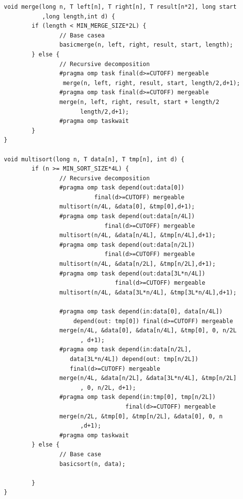 \documentclass{article}
\begin{document}
\begin{lstlisting}
void merge(long n, T left[n], T right[n], T result[n*2], long start
           ,long length,int d) {
        if (length < MIN_MERGE_SIZE*2L) {
                // Base casea
                basicmerge(n, left, right, result, start, length);
        } else {
                // Recursive decomposition
                #pragma omp task final(d>=CUTOFF) mergeable
                 merge(n, left, right, result, start, length/2,d+1);
                #pragma omp task final(d>=CUTOFF) mergeable
                merge(n, left, right, result, start + length/2
                      length/2,d+1);
                #pragma omp taskwait
        }
}

void multisort(long n, T data[n], T tmp[n], int d) {
        if (n >= MIN_SORT_SIZE*4L) {
                // Recursive decomposition
                #pragma omp task depend(out:data[0]) 
                          final(d>=CUTOFF) mergeable
                multisort(n/4L, &data[0], &tmp[0],d+1);
                #pragma omp task depend(out:data[n/4L]) 
                             final(d>=CUTOFF) mergeable
                multisort(n/4L, &data[n/4L], &tmp[n/4L],d+1);
                #pragma omp task depend(out:data[n/2L])
                             final(d>=CUTOFF) mergeable
                multisort(n/4L, &data[n/2L], &tmp[n/2L],d+1);
                #pragma omp task depend(out:data[3L*n/4L]) 
                                final(d>=CUTOFF) mergeable
                multisort(n/4L, &data[3L*n/4L], &tmp[3L*n/4L],d+1);
                
                #pragma omp task depend(in:data[0], data[n/4L])
                    depend(out: tmp[0]) final(d>=CUTOFF) mergeable
                merge(n/4L, &data[0], &data[n/4L], &tmp[0], 0, n/2L
                      , d+1);
                #pragma omp task depend(in:data[n/2L],
                   data[3L*n/4L]) depend(out: tmp[n/2L])
                   final(d>=CUTOFF) mergeable
                merge(n/4L, &data[n/2L], &data[3L*n/4L], &tmp[n/2L]
                      , 0, n/2L, d+1);
                #pragma omp task depend(in:tmp[0], tmp[n/2L])
                                   final(d>=CUTOFF) mergeable
                merge(n/2L, &tmp[0], &tmp[n/2L], &data[0], 0, n
                      ,d+1);
                #pragma omp taskwait
        } else {
                // Base case
                basicsort(n, data);

        }
}
\end{lstlisting}
\end{document}
